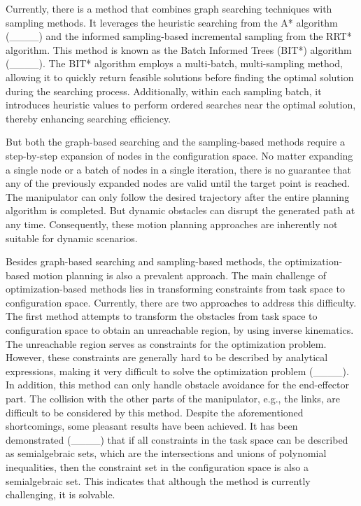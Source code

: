 Currently, there is a method that combines graph searching techniques with sampling methods. It leverages the heuristic searching from the A* algorithm (____) and the informed sampling-based incremental sampling from the RRT* algorithm. This method is known as the Batch Informed Trees (BIT*) algorithm (____). The BIT* algorithm employs a multi-batch, multi-sampling method, allowing it to quickly return feasible solutions before finding the optimal solution during the searching process. Additionally, within each sampling batch, it introduces heuristic values to perform ordered searches near the optimal solution, thereby enhancing searching efficiency.

But both the graph-based searching and the sampling-based methods require a step-by-step expansion of nodes in the configuration space. No matter expanding a single node or a batch of nodes in a single iteration, there is no guarantee that any of the previously expanded nodes are valid until the target point is reached. The manipulator can only follow the desired trajectory after the entire planning algorithm is completed. But dynamic obstacles can disrupt the generated path at any time. Consequently, these motion planning approaches are inherently not suitable for dynamic scenarios.

Besides graph-based searching and sampling-based methods, the optimization-based motion planning is also a prevalent approach. The main challenge of optimization-based methods lies in transforming constraints from task space to configuration space. Currently, there are two approaches to address this difficulty. The first method attempts to transform the obstacles from task space to configuration space to obtain an unreachable region, by using inverse kinematics. The unreachable region serves as constraints for the optimization problem. However, these constraints are generally hard to be described by analytical expressions, making it very difficult to solve the optimization problem (____). In addition, this method can only handle obstacle avoidance for the end-effector part. The collision with the other parts of the manipulator, e.g., the links, are difficult to be considered by this method. Despite the aforementioned shortcomings, some pleasant results have been achieved. It has been demonstrated (____) that if all constraints in the task space can be described as semialgebraic sets, which are the intersections and unions of polynomial inequalities, then the constraint set in the configuration space is also a semialgebraic set. This indicates that although the method is currently challenging, it is solvable.


